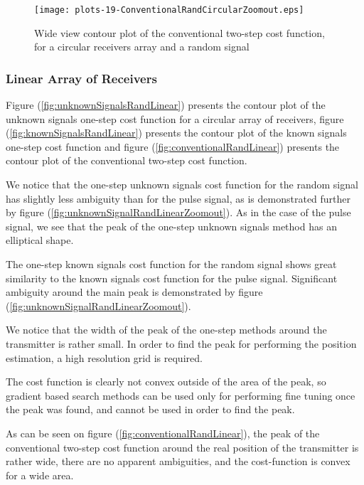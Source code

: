 \begin{figure}
\begin{center}
\texttt{[image: plots-19-ConventionalRandCircularZoomout.eps]} 
\end{center}
\caption{Wide view contour plot of the conventional two-step cost function, for a circular receivers array and a random signal}
\label{fig:conventionalSignalRandCircularZoomout}
\end{figure}

\subsubsection*{Linear Array of Receivers}
Figure (\ref{fig:unknownSignalsRandLinear}) presents the contour plot of the unknown signals one-step cost function for a circular array of receivers, figure (\ref{fig:knownSignalsRandLinear}) presents the contour plot of the known signals one-step cost function and figure (\ref{fig:conventionalRandLinear}) presents the contour plot of the conventional two-step cost function.

We notice that the one-step unknown signals cost function for the random signal has slightly less ambiguity than for the pulse signal, as is demonstrated further by figure (\ref{fig:unknownSignalRandLinearZoomout}).
As in the case of the pulse signal, we see that the peak of the one-step unknown signals method has an elliptical shape.

The one-step known signals cost function for the random signal shows great similarity to the known signals cost function for the pulse signal. Significant ambiguity around the main peak is demonstrated by figure (\ref{fig:unknownSignalRandLinearZoomout}).

We notice that the width of the peak of the one-step methods around the transmitter is rather small. In order to find the peak for performing the position estimation, a high resolution grid is required. 

The cost function is clearly not convex outside of the area of the peak, so gradient based search methods can be used only for performing fine tuning once the peak was found, and cannot be used in order to find the peak.

As can be seen on figure (\ref{fig:conventionalRandLinear}), the peak of the conventional two-step cost function around the real position of the transmitter is rather wide, there are no apparent ambiguities, and the cost-function is convex for a wide area. 

